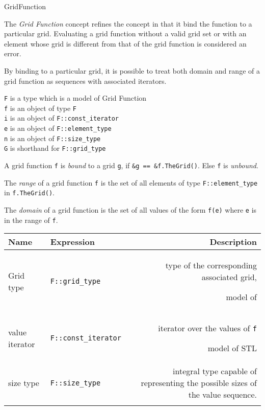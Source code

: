 \begin{Label}{GridFunction}
\end{Label}


The  {\em Grid Function\/} concept refines the 
 concept
in that it bind the function
to a particular grid. 
Evaluating  a grid function without a valid grid set or
with an element whose grid is different from that of the grid function
is considered an error.

By binding to a particular grid, it is possible to treat both domain
and range of a grid function as  sequences with associated iterators.


{\tt F} is a type which is a model of  Grid  Function 
\\
{\tt f} is an object of type  {\tt F}
\\
{\tt i} is an object of  {\tt F::const\_iterator}
\\
{\tt e} is an object of  {\tt F::element\_type}
\\
{\tt n} is an object of  {\tt F::size\_type}
\\
{\tt G} is shorthand for  {\tt F::grid\_type}

\label{bound}
A grid function {\tt f} is {\em bound\/} to a grid {\tt g},
if {\tt \&g == \&f.TheGrid()}. Else  {\tt f} is {\em unbound\/}.

\label{range}    
The {\em range\/} of a grid function {\tt f} is the set of all elements of type
{\tt F::element\_type} in {\tt f.TheGrid()}.

\label{domain}
The {\em domain\/} of a grid function is the set of all values of the form {\tt f(e)} 
where {\tt e} is in the range of {\tt f}.


\begin{tabularx}{14cm}{llR}
  \hline
  \bf  Name  &\bf  Expression  &\bf  Description   \\ 
  \hline
  Grid type & 
  {\tt F::grid\_type} &
  type of the corresponding associated grid,
  \par model of  
  \\ 
  value iterator &
  {\tt F::const\_iterator} &
  iterator over the values of {\tt f}
  \par model of STL
  \\ 
  size type & 
  {\tt F::size\_type} &
  integral type capable of representing the possible sizes
  of the value sequence.
  \\ 
  \hline
  \\
\end{tabularx}

